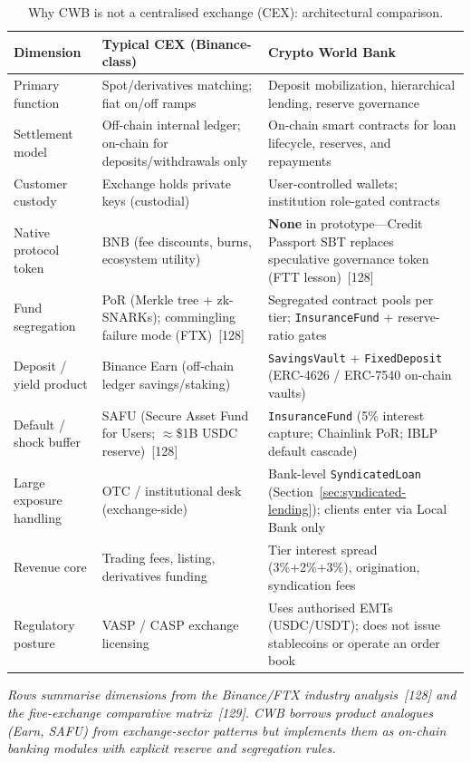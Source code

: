 \documentclass[12pt,a4paper]{report}
\newcommand{\tableheadcolor}{\rowcolor{TableHeadBg}}
\begin{document}
\begin{table}[H]
\centering
\caption[Why CWB is not a CEX]{Why CWB is not a centralised exchange (CEX): architectural comparison.}
\label{tab:cex-vs-cwb}
\begin{tabular}{p{3.2cm}p{5.2cm}p{5.2cm}}
\toprule
\tableheadcolor
\textbf{Dimension} & \textbf{Typical CEX (Binance-class)} & \textbf{Crypto World Bank} \\
\midrule
Primary function & Spot/derivatives matching; fiat on/off ramps & Deposit mobilization, hierarchical lending, reserve governance \\
Settlement model & Off-chain internal ledger; on-chain for deposits/withdrawals only & On-chain smart contracts for loan lifecycle, reserves, and repayments \\
Customer custody & Exchange holds private keys (custodial) & User-controlled wallets; institution role-gated contracts \\
Native protocol token & BNB (fee discounts, burns, ecosystem utility) & \textbf{None} in prototype---Credit Passport SBT replaces speculative governance token (FTT lesson)~[128] \\
Fund segregation & PoR (Merkle tree + zk-SNARKs); commingling failure mode (FTX)~[128] & Segregated contract pools per tier; \texttt{InsuranceFund} + reserve-ratio gates \\
Deposit / yield product & Binance Earn (off-chain ledger savings/staking) & \texttt{SavingsVault} + \texttt{FixedDeposit} (ERC-4626 / ERC-7540 on-chain vaults) \\
Default / shock buffer & SAFU (Secure Asset Fund for Users; $\approx$\$1B USDC reserve)~[128] & \texttt{InsuranceFund} (5\% interest capture; Chainlink PoR; IBLP default cascade) \\
Large exposure handling & OTC / institutional desk (exchange-side) & Bank-level \texttt{SyndicatedLoan} (Section~\ref{sec:syndicated-lending}); clients enter via Local Bank only \\
Revenue core & Trading fees, listing, derivatives funding & Tier interest spread (3\%+2\%+3\%), origination, syndication fees \\
Regulatory posture & VASP / CASP exchange licensing & Uses authorised EMTs (USDC/USDT); does not issue stablecoins or operate an order book \\
\bottomrule
\end{tabular}
\end{table}

\vspace{2pt}
\noindent\textit{\small Rows summarise dimensions from the Binance/FTX industry analysis~[128] and the five-exchange comparative matrix~[129]. CWB borrows \textit{product analogues} (Earn, SAFU) from exchange-sector patterns but implements them as on-chain banking modules with explicit reserve and segregation rules.}
\end{document}
